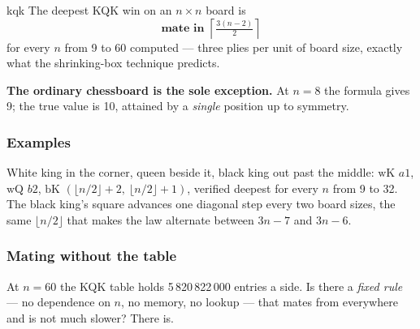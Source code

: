 \documentclass[10pt]{article}
\begin{document}
\begin{result}[title={KQK depth law}]{kqk}
The deepest KQK win on an $n\times n$ board is
\[ \textbf{mate in } \left\lceil \tfrac{3(n-2)}{2} \right\rceil \]
for every $n$ from 9 to 60 computed --- three plies per unit of board size,
exactly what the shrinking-box technique predicts.

\smallskip
\textbf{The ordinary chessboard is the sole exception.} At $n=8$ the formula
gives 9; the true value is 10, attained by a \emph{single} position up to
symmetry.
\end{result}

\subsubsection{Examples}\label{sub:kqk-family}

\noindent
White king in the corner, queen beside it, black king out past the middle:
$\text{wK }a1$, $\text{wQ }b2$,
$\text{bK }(\lfloor n/2\rfloor+2,\ \lfloor n/2\rfloor+1)$, verified deepest for
every $n$ from 9 to 32. The black king's square advances one diagonal step
every two board sizes, the same $\lfloor n/2\rfloor$ that makes the law
alternate between $3n-7$ and $3n-6$.

\medskip
\noindent
\hfill
{}\hfill
{}

\medskip
{}

\subsubsection{Mating without the table}\label{sub:kqk-rule}

At $n=60$ the KQK table holds 5\,820\,822\,000 entries a side. Is there a
\emph{fixed rule} --- no dependence on $n$, no memory, no lookup --- that mates
from everywhere and is not much slower? There is.
\end{document}
